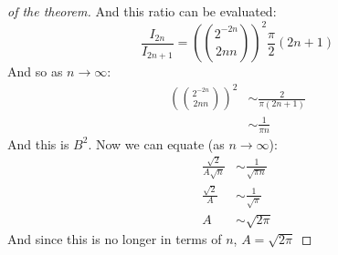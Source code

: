 \documentclass[../Main.tex]{subfiles}
\begin{document}
\begin{proof}[of the theorem]
    And this ratio can be evaluated:
    \begin{equation*}
        \frac{I_{2n}}{I_{2n+1}} = \left(2^{-2n} \choose{2n}{n}\right)^2 \frac{\pi}{2} (2n+1)
    \end{equation*}
    And so as $n \to \infty$:
    \begin{align*}
        \left(2^{-2n} \choose{2n}{n}\right)^2 &\sim \frac{2}{\pi(2n+1)} \\
        &\sim \frac{1}{\pi n}
    \end{align*}
    And this is $B^2$. Now we can equate (as $n \to \infty$):
    \begin{align*}
        \frac{\sqrt{2}}{A \sqrt{n}} &\sim \frac{1}{\sqrt{\pi n}} \\
        \frac{\sqrt{2}}{A} &\sim \frac{1}{\sqrt{\pi}} \\
        A &\sim \sqrt{2\pi}
    \end{align*}
    And since this is no longer in terms of $n$, $A = \sqrt{2\pi}$
\end{proof}
\end{document}
